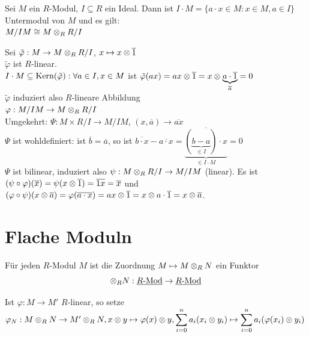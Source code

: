 \documentclass[a4paper, 10pt]{report}
\begin{document}
\begin{Prop}
  Sei $M$ ein $R$-Modul, $I \subseteq R$ ein Ideal. Dann ist $I \cdot M = 
  \{ a \cdot x \in M: x \in M, a \in I \}$ Untermodul von $M$ und es gilt: \\
  $M/IM \cong M \ten[R] R/I$
\end{Prop}

\begin{Bew}
  Sei $\tilde{\varphi}: M \rightarrow M \ten[R] R/I$, 
  $ x \mapsto x \ten \overline 1$\\
  $\tilde{\varphi}$  ist $R$-linear.\\
  $I \cdot M \subseteq \mathrm{Kern}(\tilde{\varphi}): \forall a \in I, x \in M$ ist
  $\tilde{\varphi}(ax) = ax \ten \overline 1 = x \ten \ub{ a \cdot \overline 1
  }{\overline a} = 0$\\
  $\tilde{\varphi}$ induziert also $R$-lineare Abbildung\\
  $\varphi: M/IM \rightarrow M \ten[R] R/I$\\
  Umgekehrt: $\Psi: M \times R/I \rightarrow M/IM$, $(x, \overline a) \rightarrow \overline{ax}$ \\
  $\Psi$ ist wohldefiniert: ist $\overline b = \overline a$, so ist $\overline{b \cdot x} - \overline{a \cdot x} =
  \overline{ \underbrace {( \underbrace{b-a}_{\in I}) \cdot x}_{ \in I \cdot M}} =0$\\
  $\Psi$ ist bilinear, induziert also $\psi: M \ten[R] R/I \to M/IM$ (linear). Es ist 
  $(\psi \circ \varphi)(\overline x )= \psi(x \ten \overline 1 ) =
  \overline{1x} = \overline x$ und
  $(\varphi \circ \psi)(x \ten \overline a ) = \varphi(\overline{a \cdot x }) =
  ax \ten \overline 1 = x \ten a\cdot \overline 1 = x \ten \overline a$.
\end{Bew}

\section{Flache Moduln}

\begin{Bem}
  Für jeden $R$-Modul $M$ ist die Zuordnung $M \mapsto M \ten[R] N$ ein Funktor
  \[
  \ten[R] N: \KatRMod \to \KatRMod
  \]
\end{Bem}

\begin{Bew} 
  Ist $\varphi: M \to M'$ $R$-linear, so setze $\varphi_N: M \ten[R] N \to M'
  \ten[R] N, x \ten y \mapsto \varphi(x) \ten y, \displaystyle
  \sum_{i=0}^na_i(x_i \ten y_i) \mapsto \sum_{i=0}^n a_i(\varphi(x_i) \ten y_i)$
\end{Bew}
\end{document}
